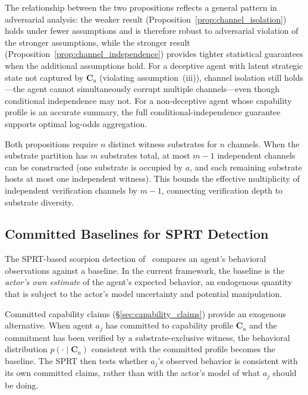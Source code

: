 \begin{remark}
The relationship between the two propositions reflects a general
pattern in adversarial analysis: the weaker result
(Proposition~\ref{prop:channel_isolation}) holds under fewer
assumptions and is therefore robust to adversarial violation of
the stronger assumptions, while the stronger result
(Proposition~\ref{prop:channel_independence}) provides tighter
statistical guarantees when the additional assumptions hold.  For a
deceptive agent with latent strategic state not captured by
$\mathbf{C}_a$ (violating assumption~(iii)), channel isolation
still holds---the agent cannot simultaneously corrupt multiple
channels---even though conditional independence may not.  For a
non-deceptive agent whose capability profile is an accurate
summary, the full conditional-independence guarantee supports
optimal log-odds aggregation.
\end{remark}

\begin{remark}
Both propositions require $n$ distinct witness substrates for $n$
channels.  When the substrate partition has $m$ substrates total, at
most $m - 1$ independent channels can be constructed (one substrate is
occupied by $a$, and each remaining substrate hosts at most one
independent witness).  This bounds the effective multiplicity of
independent verification channels by $m - 1$, connecting verification
depth to substrate diversity.
\end{remark}

\subsection{Committed Baselines for SPRT Detection}
\label{sec:committed_baselines}

The SPRT-based scorpion detection of~\citet{lasser2026scm} compares an agent's behavioral
observations against a baseline.  In the current framework, the baseline
is the \emph{actor's own estimate} of the agent's expected behavior, an
endogenous quantity that is subject to the actor's model uncertainty and
potential manipulation.

Committed capability claims (\S\ref{sec:capability_claims}) provide an
exogenous alternative.  When agent $a_j$ has committed to capability
profile $\mathbf{C}_a$ and the commitment has been verified by a
substrate-exclusive witness, the behavioral distribution $p(\cdot \mid
\mathbf{C}_a)$ consistent with the committed profile becomes the
baseline.  The SPRT then tests whether $a_j$'s observed behavior is
consistent with its own committed claims, rather than with the actor's
model of what $a_j$ should be doing.


